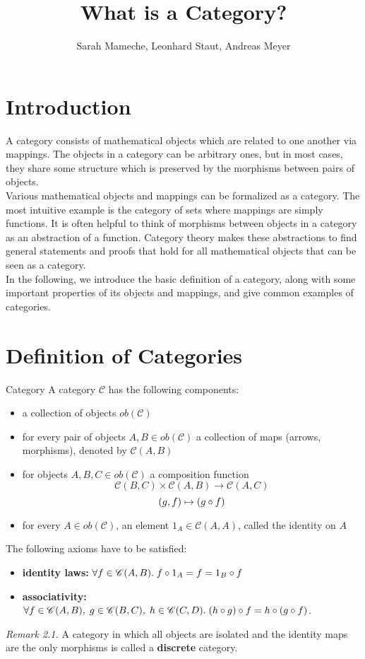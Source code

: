 
\def\pathToRoot{../}

\usepackage{charter}
\selectfont


\title{What is a Category?}
\author{Sarah Mameche, Leonhard Staut, Andreas Meyer}
\maketitle
\section {Introduction}
A category consists of mathematical objects which are related to one another via mappings. The objects in a category can be arbitrary ones, but in most cases, they share some structure which is preserved by the morphisms between pairs of objects.\\ Various mathematical objects and mappings can be formalized as a category. The most intuitive example is the category of sets where mappings are simply functions. It is often helpful to think of morphisms between objects in a category as an abstraction of a function. Category theory makes these abstractions to find general statements and proofs that hold for all mathematical objects that can be seen as a category.
\\ In the following, we introduce the basic definition of a category, along with some important properties of its objects and mappings, and give common examples of categories.
\section {Definition of Categories}
\begin{definition}{Category}
	A category $\mathscr{C}$ has the following components:
	\begin{itemize}
		\item a collection of objects $ob(\mathscr{C})$
		\item for every pair of objects $A, B \in ob(\mathscr{C})$ a collection of maps (arrows, morphisms), denoted by $\mathscr{C}(A, B)$
		\item for objects $A, B, C \in ob(\mathscr{C})$ a composition function
		\[\mathscr{C}(B, C) \times \mathscr{C}(A, B) \rightarrow  \mathscr{C}(A, C)
		\]		\[ (g,f) \mapsto (g \mathbin{\circ} f)
		\]
		\item for every $A \in ob(\mathscr{C})$, an element $1_A \in \mathscr{C}(A, A)$, called the identity on $A$ 
 	\end{itemize}
 The following axioms have to be satisfied:
 \begin{itemize}
 	\item \textbf{identity laws:} $\forall f \in \mathscr{C}(A, B). \; f \mathbin{\circ} 1_A = f = 1_B \mathbin{\circ} f$ 
 	\item \textbf{associativity:} $\forall f \in \mathscr{C}(A, B), \; g \in \mathscr{C}(B, C), \; h \in \mathscr{C}(C, D). \; (h \mathbin{\circ} g) \mathbin{\circ} f = h \mathbin{\circ} (g \mathbin{\circ} f) $.
 \end{itemize}
\end{definition}
    \textit{Remark 2.1.} A category in which all objects are isolated and the identity maps are the only morphisms is called a \textbf{discrete} category.

